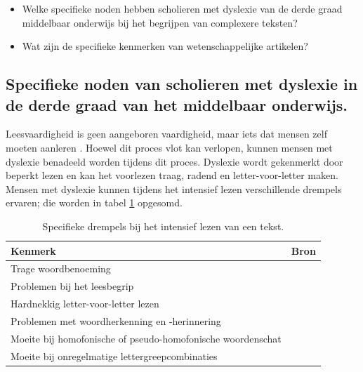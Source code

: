 \begin{itemize}
	\item Welke specifieke noden hebben scholieren met dyslexie van de derde graad middelbaar onderwijs bij het begrijpen van complexere teksten?
	\item Wat zijn de specifieke kenmerken van wetenschappelijke artikelen?
\end{itemize}

\subsection{Specifieke noden van scholieren met dyslexie in de derde graad van het middelbaar onderwijs.}

Leesvaardigheid is geen aangeboren vaardigheid, maar iets dat mensen zelf moeten aanleren \autocite{Bonte2020, VanDerMeer2022}. Hoewel dit proces vlot kan verlopen, kunnen mensen met dyslexie benadeeld worden tijdens dit proces.  Dyslexie wordt gekenmerkt door beperkt lezen en kan het voorlezen traag, radend en letter-voor-letter maken. Mensen met dyslexie kunnen tijdens het intensief lezen verschillende drempels ervaren; die worden in tabel \ref{table:dyslexia-hurdles} opgesomd.

\begin{center}
	\begin{table}[H]
	\begin{tabular}{ | m{10cm} | m{6cm} | } 
		\hline
		\textbf{Kenmerk} & \textbf{Bron} \\ 
		\hline
		Trage woordbenoeming &  \autocite{Bonte2020} \\
		\hline
		Problemen bij het leesbegrip & \autocite{Gala2016, Bonte2020} \\ 
		\hline
		Hardnekkig letter-voor-letter lezen & \autocite{Bonte2020, Zhang2021} \\ 
		\hline
		Problemen met woordherkenning en -herinnering & \autocite{Bonte2020} \\
		\hline
		Moeite bij homofonische of pseudo-homofonische woordenschat & \autocite{Zhang2021} \\
		\hline
		Moeite bij onregelmatige lettergreepcombinaties & \textcite{Gala2016} \\
		\hline
	\end{tabular}
	\caption{Specifieke drempels bij het intensief lezen van een tekst.}
	\label{table:dyslexia-hurdles}
	\end{table}
\end{center}

